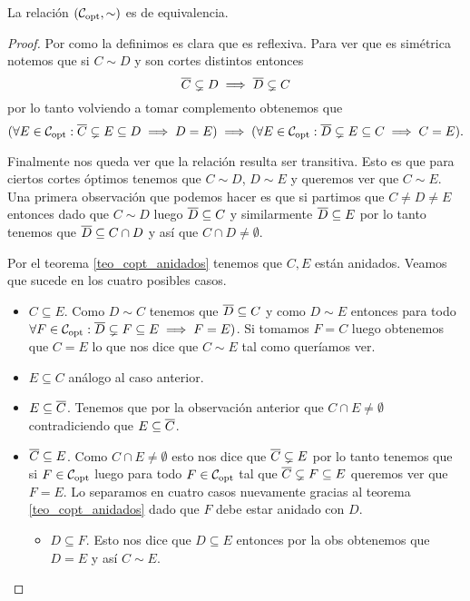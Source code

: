 \documentclass[tesis.tex]{subfiles}
\begin{document}
\begin{prop}
	La relación $({\cal C}_{\text{opt}}, \sim)$ es de equivalencia.
\end{prop}
\begin{proof}
	Por como la definimos es clara que es reflexiva.
	Para ver que es simétrica notemos que si $C \sim D$ y son cortes distintos entonces  
	\[
		\overline C \subsetneq D \implies \overline D \subsetneq C
	\]
	por lo tanto volviendo a tomar complemento obtenemos que
	\[
(	\forall E \in {\cal C}_{\text{opt}} : \overline C \subsetneq E \subseteq D \implies D = E) \implies 
	(\forall E \in {\cal C}_{\text{opt}} : \overline D \subsetneq E \subseteq C \implies C = E).
	\]
	
	Finalmente nos queda ver que la relación resulta ser transitiva.
	Esto es que para ciertos cortes óptimos tenemos que $C \sim D$, $D \sim E$ y queremos ver que $C \sim E$.
	Una primera observación que podemos hacer es que si partimos que $C \neq D \neq E$ entonces dado que $C \sim D$ luego $\overline D \subseteq C$ y similarmente $\overline D \subseteq E$ por lo tanto tenemos que $\overline D \subseteq C \cap D$ y así que $C \cap D \neq \emptyset$.

	Por el teorema \ref{teo_copt_anidados} tenemos que $C,E$ están anidados.
	Veamos que sucede en los cuatro posibles casos.
	\begin{itemize}
		\item $C \subseteq E$. 
		Como $D \sim C$ tenemos que $ \overline D \subseteq C $ y como $D \sim E$ entonces para todo $\forall F \in {\cal C}_{\text{opt}} : \overline D \subsetneq F \subseteq E \implies F = E)$. 
		Si tomamos $F = C$ luego obtenemos que $C = E$ lo que nos dice que $C \sim E$ tal como queríamos ver.
		
		
		\item $E \subseteq C$ análogo al caso anterior.
		\item $E \subseteq \overline C$.
		Tenemos que por la observación anterior que $C \cap E \neq \emptyset$ contradiciendo que $E \subseteq \overline C$.
		\item $\overline C \subseteq E$.
		Como $C \cap E \neq \emptyset$ esto nos dice que $\overline C \subsetneq E$ por lo tanto tenemos que si $F \in {\cal C}_{\text{opt}}$ luego para todo $F \in {\cal C}_{\text{opt}}$ tal que $\overline C \subsetneq F \subseteq E$ queremos ver que $F=E$.
		Lo separamos en cuatro casos nuevamente gracias al teorema \ref{teo_copt_anidados} dado que $F$ debe estar anidado con $D$.
		\begin{itemize}
			\item $D \subseteq F$.
			Esto nos dice que $D \subseteq E$ entonces por la obs \label{obs_copt_igualdad} obtenemos que $D = E$ y así $C \sim E$.
			

\end{itemize}
\end{itemize}
\end{proof}
\end{document}
